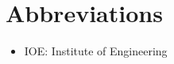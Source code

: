 \documentclass[main]{subfiles}
\begin{document}
\chapter*{\centering Abbreviations}

\begin{itemize}
		\item IOE: Institute of Engineering
\end{itemize}
\end{document}
